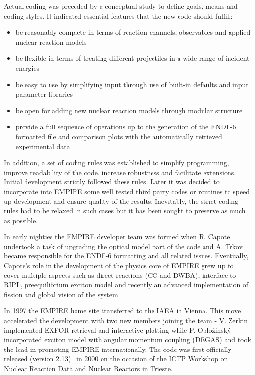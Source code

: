 Actual coding was preceded by a conceptual study to define goals, means and
coding styles. It indicated essential features that the new code should
fulfill:

\begin{itemize}
\item be reasonably complete in terms of reaction channels, observables and
applied nuclear reaction models

\item be flexible in terms of treating different projectiles in a wide range
of incident energies

\item be easy to use by simplifying input through use of built-in defaults
and input parameter libraries

\item be open for adding new nuclear reaction models through modular
structure

\item provide a full sequence of operations up to the generation of the
ENDF-6 formatted file and comparison plots with the automatically retrieved
experimental data
\end{itemize}

In addition, a set of coding rules was established to simplify programming,
improve readability of the code, increase robustness and facilitate
extensions. Initial development strictly followed these rules. Later it was
decided to incorporate into EMPIRE some well tested third party codes or
routines to speed up development and ensure quality of the results.
Inevitably, the strict coding rules had to be relaxed in such cases but it
has been sought to preserve as much as possible.

In early nighties the EMPIRE developer team was formed when R. Capote
undertook a task of upgrading the optical model part of the code and A.
Trkov became responsible for the ENDF-6 formatting and all related issues.
Eventually, Capote's role in the development of the physics core of EMPIRE
grew up to cover multiple aspects such as direct reactions (CC and DWBA),
interface to RIPL, preequilibrium exciton model and recently an advanced
implementation of fission and global vision of the system.

In 1997 the EMPIRE home site transferred to the IAEA in Vienna. This move
accelerated the development with two new members joining the team - V.
Zerkin implemented EXFOR retrieval and interactive plotting while P. Oblo\v
zinsk\'y incorporated exciton model with angular momentum coupling (DEGAS)
and took the lead in promoting EMPIRE internationally. The code was first
officially released (version 2.13)~\cite{EMPIRE:Trieste01} in 2000 on the
occasion of the ICTP Workshop on Nuclear Reaction Data and Nuclear Reactors
in Trieste.

